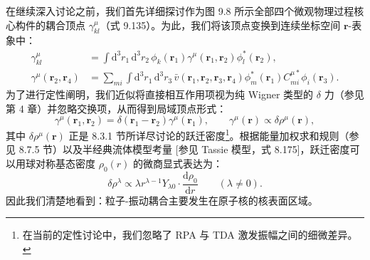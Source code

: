 在继续深入讨论之前，我们首先详细探讨作为图 9.8 所示全部四个微观物理过程核心构件的耦合顶点 $\gamma^{\mu}_{kl}$（式
9.135）。为此，我们将该顶点变换到连续坐标空间 $\boldsymbol{r}$-表象中：
\begin{align}
\gamma^{\mu}_{kl} & =\int\mathrm{d}^{3}r_{1}\,\mathrm{d}^{3}r_{2}\,\phi_{k}(\boldsymbol{r}_{1})\gamma^{\mu}(\boldsymbol{r}_{1},\boldsymbol{r}_{2})\phi^{*}_{l}(\boldsymbol{r}_{2}),\label{eq:9.141}\\
\gamma^{\mu}(\boldsymbol{r}_{2},\boldsymbol{r}_{4}) & =\sum_{mi}\int\mathrm{d}^{3}r_{1}\,\mathrm{d}^{3}r_{3}\,\bar{v}(\boldsymbol{r}_{1},\boldsymbol{r}_{2},\boldsymbol{r}_{3},\boldsymbol{r}_{4})\phi^{*}_{m}(\boldsymbol{r}_{1})C^{\mu*}_{mi}\phi_{i}(\boldsymbol{r}_{3}).\nonumber 
\end{align}
为了进行定性阐明，我们近似将直接相互作用项视为纯 Wigner 类型的 $\delta$ 力（参见第 4 章）并忽略交换项，从而得到局域顶点形式：
\begin{equation}
\gamma^{\mu}(\boldsymbol{r}_{1},\boldsymbol{r}_{2})=\delta(\boldsymbol{r}_{1}-\boldsymbol{r}_{2})\gamma^{\mu}(\boldsymbol{r}_{1}),\qquad\gamma^{\mu}(\boldsymbol{r})\propto\delta\rho^{\mu}(\boldsymbol{r}),\label{eq:9.142}
\end{equation}
其中 $\delta\rho^{\mu}(\boldsymbol{r})$ 正是 8.3.1 节所详尽讨论的跃迁密度\footnote{在当前的定性讨论中，我们忽略了 RPA 与 TDA 激发振幅之间的细微差异。}。根据能量加权求和规则（参见
8.7.5 节）以及半经典流体模型考量 {[}参见 Tassie 模型，式 8.175{]}，跃迁密度可以用球对称基态密度 $\rho_{0}(r)$
的微商显式表达为：
\begin{equation}
\delta\rho^{\lambda}\propto\lambda r^{\lambda-1}Y_{\lambda0}\cdot\frac{\mathrm{d}\rho_{0}}{\mathrm{d}r}\qquad(\lambda\ne0).\label{eq:9.143}
\end{equation}
因此我们清楚地看到：粒子-振动耦合主要发生在原子核的核表面区域。

